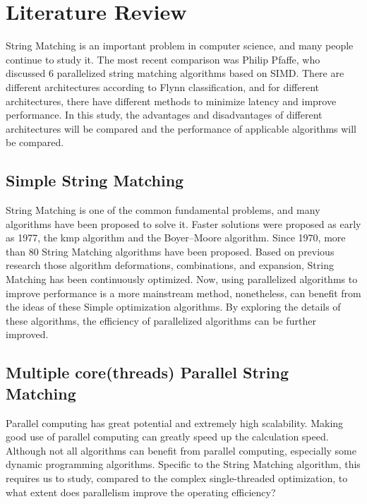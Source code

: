 \documentclass[11pt]{article}       %
\begin{document}
\section{Literature Review} \label{litrev}


String Matching is an important problem in computer science, and many people continue to study it. The most recent comparison was Philip Pfaffe, who discussed 6 parallelized string matching algorithms based on SIMD\cite{Matching}. There are different architectures according to Flynn classification, and for different architectures, there have different methods to minimize latency and improve performance. In this study, the advantages and disadvantages of different architectures will be compared and the performance of applicable algorithms will be compared. \\

\subsection{Simple String Matching}\label{Simple}
String Matching is one of the common fundamental problems, and many algorithms have been proposed to solve it. Faster solutions were proposed as early as 1977, the kmp algorithm and the Boyer–Moore algorithm\cite{Matching}. Since 1970, more than 80 String Matching algorithms have been proposed. Based on previous research those algorithm deformations, combinations, and expansion, String Matching has been continuously optimized. Now, using parallelized algorithms to improve performance is a more mainstream method\cite{Matching}, nonetheless, can benefit from the ideas of these Simple optimization algorithms. By exploring the details of these algorithms, the efficiency of parallelized algorithms can be further improved. \\

\subsection{Multiple core(threads) Parallel String Matching}\label{Multiple}
Parallel computing has great potential and extremely high scalability. Making good use of parallel computing can greatly speed up the calculation speed. Although not all algorithms can benefit from parallel computing, especially some dynamic programming algorithms. Specific to the String Matching algorithm, this requires us to study, compared to the complex single-threaded optimization, to what extent does parallelism improve the operating efficiency? \\
\end{document}
